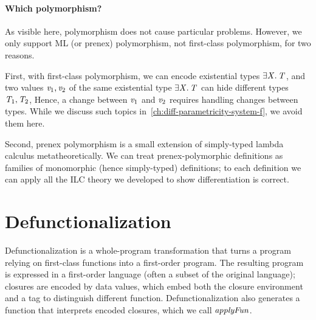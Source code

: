 \paragraph{Which polymorphism?}
As visible here, polymorphism does not cause particular problems. However, we
only support ML (or prenex) polymorphism, not first-class
polymorphism, for two reasons.


First, with first-class polymorphism, we can encode
existential types \ensuremath{\exists \Conid{X}\hsforall \hsdot{\circ }{\mathpunct{.}}\Conid{T}}, and two values \ensuremath{\Varid{v}_{1},\Varid{v}_{2}} of the same existential type
\ensuremath{\exists \Conid{X}\hsforall \hsdot{\circ }{\mathpunct{.}}\Conid{T}} can hide different types \ensuremath{\Conid{T}_{1},\Conid{T}_{2}},
Hence, a change between \ensuremath{\Varid{v}_{1}} and \ensuremath{\Varid{v}_{2}} requires handling changes between types.
While we discuss such topics in~\cref{ch:diff-parametricity-system-f}, we avoid
them here.

Second, prenex polymorphism is a small extension of simply-typed lambda calculus
metatheoretically. We can treat prenex-polymorphic definitions as families of
monomorphic (hence simply-typed) definitions; to each definition we can apply
all the ILC theory we developed to show differentiation is correct.

\section{Defunctionalization}
Defunctionalization is a whole-program transformation that turns a program
relying on first-class functions into a first-order program. The resulting
program is expressed in a first-order language (often a subset of the original
language); closures are encoded by data values, which embed both the closure
environment and a tag to distinguish different function. Defunctionalization
also generates a function that interprets encoded closures, which we call
\ensuremath{\Varid{applyFun}}.









